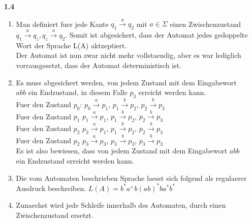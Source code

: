 \documentclass{article}
\begin{document}
\begin{enumerate}
    \item[\textbf{1.4}]
        \begin{enumerate}
            \item
                Man definiert fuer jede Kante $q_1 \overset{a}{\longrightarrow} q_2$ mit $a \in \Sigma$ einen Zwischenzustand $q_1 \overset{a}{\longrightarrow} q_z, q_z \overset{a}{\longrightarrow} q_2$. Somit ist abgesichert, dass der Automat jedes gedoppelte Wort der Sprache L(A) aktzeptiert.\\
                Der Automat ist nun zwar nicht mehr vollstaendig, aber es war lediglich vorrausgesetzt, dass der Automat deterministisch ist. 
            \item
                Es muss abgesichert werden, von jedem Zustand mit dem Eingabewort $abb$ ein Endzustand, in diesem Falle $p_3$ erreicht werden kann.\\
                Fuer den Zustand $p_0$:
                $p_0 \overset{a}{\longrightarrow} p_1$, $p_1 \overset{b}{\longrightarrow} p_2$, $p_2 \overset{b}{\longrightarrow} p_3$\\
                Fuer den Zustand $p_1$
                $p_1 \overset{a}{\longrightarrow} p_1$, $p_1 \overset{b}{\longrightarrow} p_2$, $p_2 \overset{b}{\longrightarrow} p_3$\\
                Fuer den Zustand $p_2$
                $p_2 \overset{a}{\longrightarrow} p_1$, $p_1 \overset{b}{\longrightarrow} p_2$, $p_2 \overset{b}{\longrightarrow} p_3$\\
                Fuer den Zustand $p_2$
                $p_3 \overset{a}{\longrightarrow} p_3$, $p_3 \overset{b}{\longrightarrow} p_3$, $p_3 \overset{b}{\longrightarrow} p_3$\\

                Es ist also bewiesen, dass von jedem Zustand mit dem Eingabewort $abb$ ein Endzustand erreicht werden kann.
            \item
                Die vom Automaten beschrieben Sprache laesst sich folgend als regulaerer Ausdruck beschreiben.
                $L(A)=b^*a^+b(ab)^*ba^*b^*$
            \item
                Zunaechst wird jede Schleife innerhalb des Automaten, durch einen Zwischenzustand ersetzt.

\end{enumerate}
\end{enumerate}
\end{document}
